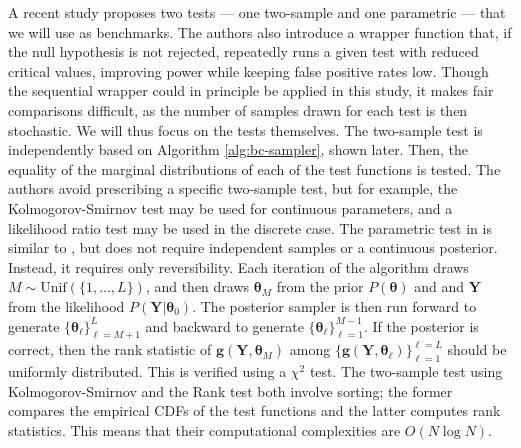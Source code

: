 \documentclass[a4paper,11pt]{article}
\begin{document}
A recent study \cite{gandy_unit_2020} proposes two tests --- one two-sample and one parametric --- that we will use as benchmarks. The authors also introduce a wrapper function that, if the null hypothesis is not rejected, repeatedly runs a given test with reduced critical values, improving power while keeping false positive rates low. Though the sequential wrapper could in principle be applied in this study, it makes fair comparisons difficult, as the number of samples drawn for each test is then stochastic. We will thus focus on the tests themselves. The two-sample test is independently based on Algorithm \ref{alg:bc-sampler}, shown later. Then, the equality of the marginal distributions of each of the test functions is tested. The authors avoid prescribing a specific two-sample test, but for example, the Kolmogorov-Smirnov test may be used for continuous parameters, and a likelihood ratio test may be used in the discrete case. The parametric test in \cite{gandy_unit_2020} is similar to \cite{talts_validating_2018}, but does not require independent samples or a continuous posterior. Instead, it requires only reversibility. Each iteration of the algorithm draws $M \sim \mathrm{Unif}(\{1, \ldots, L\})$, and then draws $\mathbf{\theta}_{M}$ from the prior $P(\mathbf{\theta})$ and and $\mathbf{Y}$ from the likelihood $P(\mathbf{Y}|\mathbf{\theta}_{0})$.  The posterior sampler is then run forward to generate $\{\mathbf{\theta}_{\ell}\}_{\ell=M+1}^{L}$ and backward to generate $\{\mathbf{\theta}_{\ell}\}_{\ell=1}^{M-1}$. If the posterior is correct, then the rank statistic of $\mathbf{g}(\mathbf{Y},\mathbf{\theta}_{M})$ among $\{\mathbf{g}(\mathbf{Y},\mathbf{\theta}_{\ell})\}_{\ell=1}^{\ell=L}$ should be uniformly distributed. This is verified using a $\chi^{2}$ test. The two-sample test using Kolmogorov-Smirnov and the Rank test both involve sorting; the former compares the empirical CDFs of the test functions and the latter computes rank statistics. This means that their computational complexities are $O(N \log N)$.
\end{document}

